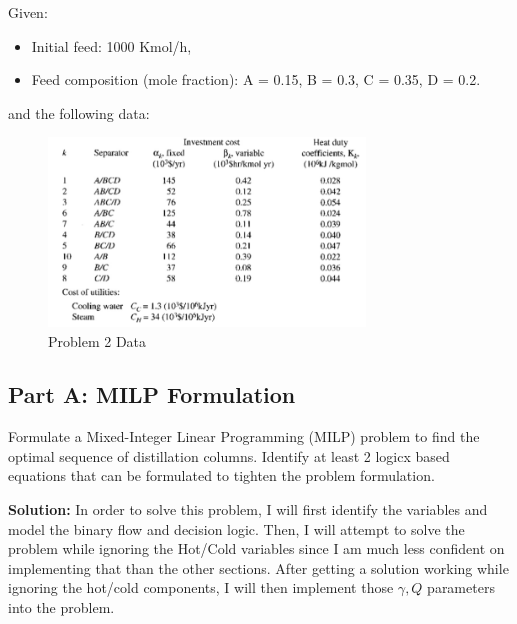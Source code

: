 \documentclass[11pt]{article}
\begin{document}
Given:
\begin{itemize}
  \item Initial feed: 1000 Kmol/h,
  \item Feed composition (mole fraction): A = 0.15, B = 0.3, C = 0.35, D = 0.2.
\end{itemize}
and the following data:
\begin{figure}[htbp]
  \centerline{\includegraphics[width=0.75\textwidth]{images/prob2_table.png}}
  \caption{Problem 2 Data}
  \label{fig:prob2_table}
\end{figure}

\subsection{Part A: MILP Formulation}
Formulate a Mixed-Integer Linear Programming (MILP) problem to find the optimal sequence of distillation columns. 
Identify at least 2 logicx based equations that can be formulated to tighten the problem formulation.

\textbf{Solution:}
In order to solve this problem, I will first identify the variables and model the binary flow and decision logic.
Then, I will attempt to solve the problem while ignoring the Hot/Cold variables since I am much less confident on implementing that than the other sections.
After getting a solution working while ignoring the hot/cold components, I will then implement those $\gamma, Q$ parameters into the problem.
\end{document}
